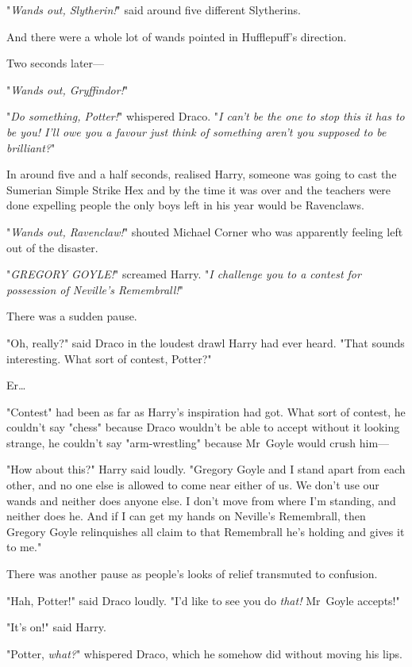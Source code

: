 "\emph{Wands out, Slytherin!}" said around five different Slytherins.

And there were a whole lot of wands pointed in Hufflepuff’s direction.

Two seconds later—

"\emph{Wands out, Gryffindor!}"

"\emph{Do something, Potter!}" whispered Draco. "\emph{I can’t be the one to
stop this it has to be you! I’ll owe you a favour just think of something
aren’t you supposed to be brilliant?}"

In around five and a half seconds, realised Harry, someone was going to cast
the Sumerian Simple Strike Hex and by the time it was over and the teachers
were done expelling people the only boys left in his year would be Ravenclaws.

"\emph{Wands out, Ravenclaw!}" shouted Michael Corner who was apparently
feeling left out of the disaster.

"\emph{GREGORY GOYLE!}" screamed Harry. "\emph{I challenge you to a contest for
possession of Neville’s Remembrall!}"

There was a sudden pause.

"Oh, really?" said Draco in the loudest drawl Harry had ever heard. "That
sounds interesting. What sort of contest, Potter?"

Er…

"Contest" had been as far as Harry’s inspiration had got. What sort of
contest, he couldn’t say "chess" because Draco wouldn’t be able to accept
without it looking strange, he couldn’t say "arm-wrestling" because Mr~Goyle
would crush him—

"How about this?" Harry said loudly. "Gregory Goyle and I stand apart from each
other, and no one else is allowed to come near either of us. We don’t use our
wands and neither does anyone else. I don’t move from where I’m standing, and
neither does he. And if I can get my hands on Neville’s Remembrall, then
Gregory Goyle relinquishes all claim to that Remembrall he’s holding and gives
it to me."

There was another pause as people’s looks of relief transmuted to confusion.

"Hah, Potter!" said Draco loudly. "I’d like to see you do \emph{that!}
Mr~Goyle accepts!"

"It’s on!" said Harry.

"Potter, \emph{what?}" whispered Draco, which he somehow did without moving his
lips.


